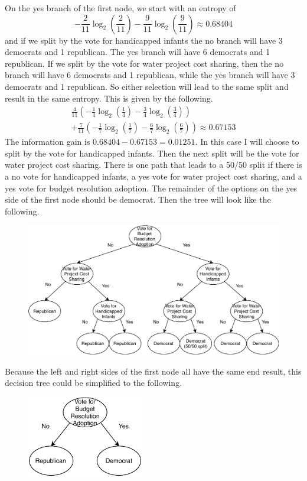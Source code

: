 \documentclass[12pt]{article}
\begin{document}
On the yes branch of the first node, we start with an entropy of
\[-\frac{2}{11}\log_2\left(\frac{2}{11}\right)-\frac{9}{11}\log_2\left(\frac{9}{11}\right)\approx0.68404\]
and if we split by the vote for handicapped infants the no branch will have 3 democrats and 1 republican. The yes branch will have
6 democrats and 1 republican. If we split by the vote for water project cost sharing, then the no branch will have 6 democrats
and 1 republican, while the yes branch will have 3 democrats and 1 republican. So either selection will lead to the same split
and result in the same entropy. This is given by the following.
\begin{multline*}
    \frac{4}{11}\left(-\frac{1}{4}\log_2\left(\frac{1}{4}\right)-\frac{3}{4}\log_2\left(\frac{3}{4}\right)\right)\\
    +\frac{7}{11}\left(-\frac{1}{7}\log_2\left(\frac{1}{7}\right)-\frac{6}{7}\log_2\left(\frac{6}{7}\right)\right)\approx 0.67153
\end{multline*}
The information gain is \(0.68404-0.67153=0.01251\). In this case I will choose to split by the vote for handicapped infants.
Then the next split will be the vote for water project cost sharing. There is one path that leads to a 50/50 split if there is a
no vote for handicapped infants, a yes vote for water project cost sharing, and a yes vote for budget resolution adoption. The remainder
of the options on the yes side of the first node should be democrat. Then the tree will look like the following.
\begin{figure}[H]
    \begin{center}
        \includegraphics[width=5in]{DecisionTree.pdf}
    \end{center}
\end{figure}
\pagebreak
Because the left and right sides of the first node all have the same end result, this decision tree could be simplified to the following.
\begin{figure}[H]
    \begin{center}
        \includegraphics[width=2in]{DecisionTreeSimplified.pdf}
    \end{center}
\end{figure}
\end{document}
